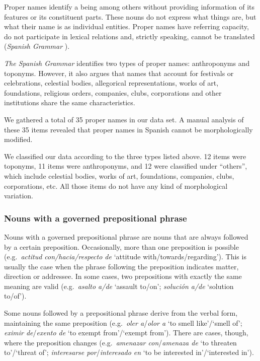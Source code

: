 \documentclass[output=paper]{langsci/langscibook}
\begin{document}
Proper names identify a being among others without providing information of its features or its constituent parts.
These nouns do not express what things are, but what their name is as individual entities.
Proper names have referring capacity, do not participate in lexical relations and, strictly speaking, cannot be translated (\textit{Spanish Grammar} \citeyear[209--210]{RAE:2010}).

\textit{The Spanish Grammar} \citeyearpar[219]{RAE:2010} identifies two types of proper names: anthroponyms and toponyms.
However, it also argues that names that account for festivals or celebrations, celestial bodies, allegorical representations, works of art, foundations, religious orders, companies, clubs, corporations and other institutions share the same characteristics.

We gathered a total of 35 proper names in our data set.
A manual analysis of these 35 items revealed that proper names in Spanish cannot be morphologically modified.

We classified our data according to the three types listed above.
12 items were toponyms, 11 items were anthroponyms, and 12 were classified under ``others'', which include celestial bodies, works of art, foundations, companies, clubs, corporations, etc.
All those items do not have any kind of morphological variation.

\subsubsection{Nouns with a governed prepositional phrase}
\label{ssssec:nouns_with_PP}

Nouns with a governed prepositional phrase are nouns that are always followed by a certain preposition.
Occasionally, more than one preposition is possible (e.g.\ \textit{actitud con/hacia/respecto de} `attitude with/towards/regarding').
This is usually the case when the phrase following the preposition indicates matter, direction or addressee.
In some cases, two prepositions with exactly the same meaning are valid (e.g.\ \textit{asalto a/de} `assault to/on'; \textit{solución a/de} `solution to/of').

Some nouns followed by a prepositional phrase derive from the verbal form, maintaining the same preposition (e.g.\ \textit{oler a}/\textit{olor a} `to smell like'/`smell of'; \textit{eximir de}/\textit{exento de} `to exempt from'/`exempt from').
There are cases, though, where the preposition changes 
(e.g.\ \textit{amenazar con}/\textit{amenaza de} `to threaten to'/`threat of'; 
\textit{interesarse por}/\textit{interesado en} `to be interested in'/`interested in').
\end{document}

